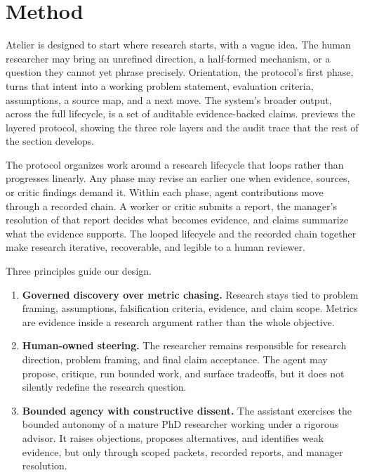 \section{Method}
\label{sec:method}

Atelier is designed to start where research starts, with a vague idea. The human researcher may bring an unrefined direction, a half-formed mechanism, or a question they cannot yet phrase precisely. Orientation, the protocol's first phase, turns that intent into a working problem statement, evaluation criteria, assumptions, a source map, and a next move. The system's broader output, across the full lifecycle, is a set of auditable evidence-backed claims.  previews the layered protocol, showing the three role layers and the audit trace that the rest of the section develops.

The protocol organizes work around a research lifecycle that loops rather than progresses linearly. Any phase may revise an earlier one when evidence, sources, or critic findings demand it. Within each phase, agent contributions move through a recorded chain. A worker or critic submits a report, the manager's resolution of that report decides what becomes evidence, and claims summarize what the evidence supports. The looped lifecycle and the recorded chain together make research iterative, recoverable, and legible to a human reviewer.

Three principles guide our design.

\begin{enumerate}
  \item \textbf{Governed discovery over metric chasing.} Research stays tied to problem framing, assumptions, falsification criteria, evidence, and claim scope. Metrics are evidence inside a research argument rather than the whole objective.
  \item \textbf{Human-owned steering.} The researcher remains responsible for research direction, problem framing, and final claim acceptance. The agent may propose, critique, run bounded work, and surface tradeoffs, but it does not silently redefine the research question.
  \item \textbf{Bounded agency with constructive dissent.} The assistant exercises the bounded autonomy of a mature PhD researcher working under a rigorous advisor. It raises objections, proposes alternatives, and identifies weak evidence, but only through scoped packets, recorded reports, and manager resolution.
\end{enumerate}

